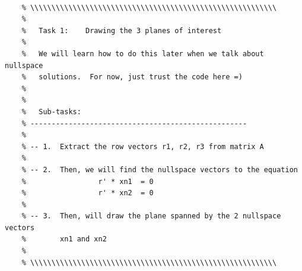 \documentclass{article}
\begin{document}
\begin{verbatim}
    
    % \\\\\\\\\\\\\\\\\\\\\\\\\\\\\\\\\\\\\\\\\\\\\\\\\\\\\\\\\\
    %
    %   Task 1:    Drawing the 3 planes of interest
    %
    %   We will learn how to do this later when we talk about nullspace
    %   solutions.  For now, just trust the code here =)
    %
    %
    %   Sub-tasks:
    % ---------------------------------------------------
    %
    % -- 1.  Extract the row vectors r1, r2, r3 from matrix A
    %
    % -- 2.  Then, we will find the nullspace vectors to the equation
    %                 r' * xn1  = 0
    %                 r' * xn2  = 0
    %
    % -- 3.  Then, will draw the plane spanned by the 2 nullspace vectors
    %        xn1 and xn2
    %
    % \\\\\\\\\\\\\\\\\\\\\\\\\\\\\\\\\\\\\\\\\\\\\\\\\\\\\\\\\\
    

\end{verbatim}
\end{document}
